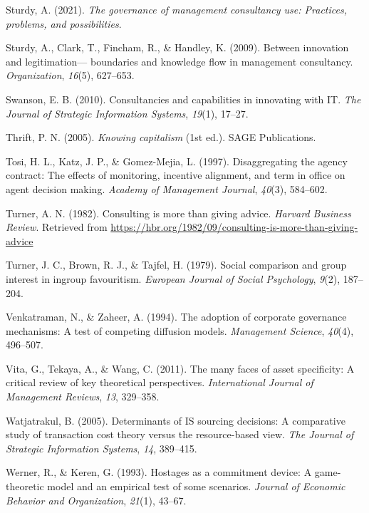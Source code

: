 \documentclass[
  man,floatsintext]{apa6}
\newlength{\cslhangindent}
\newenvironment{CSLReferences}[2] %
 {\begin{list}{}{%
  \setlength{\itemindent}{0pt}
  \setlength{\leftmargin}{0pt}
  \setlength{\parsep}{0pt}
  \ifodd #1
   \setlength{\leftmargin}{\cslhangindent}
   \setlength{\itemindent}{-1\cslhangindent}
  \fi
  \setlength{\itemsep}{#2\baselineskip}}}
 {\end{list}}
\begin{document}
\begin{CSLReferences}{1}{0}
Sturdy, A. (2021). \emph{The governance of management consultancy use: Practices, problems, and possibilities}.

Sturdy, A., Clark, T., Fincham, R., \& Handley, K. (2009). Between innovation and legitimation--- boundaries and knowledge flow in management consultancy. \emph{Organization}, \emph{16}(5), 627--653.

Swanson, E. B. (2010). Consultancies and capabilities in innovating with IT. \emph{The Journal of Strategic Information Systems}, \emph{19}(1), 17--27.

Thrift, P. N. (2005). \emph{Knowing capitalism} (1st ed.). SAGE Publications.

Tosi, H. L., Katz, J. P., \& Gomez-Mejia, L. (1997). Disaggregating the agency contract: The effects of monitoring, incentive alignment, and term in office on agent decision making. \emph{Academy of Management Journal}, \emph{40}(3), 584--602.

Turner, A. N. (1982). Consulting is more than giving advice. \emph{Harvard Business Review}. Retrieved from \url{https://hbr.org/1982/09/consulting-is-more-than-giving-advice}

Turner, J. C., Brown, R. J., \& Tajfel, H. (1979). Social comparison and group interest in ingroup favouritism. \emph{European Journal of Social Psychology}, \emph{9}(2), 187--204.

Venkatraman, N., \& Zaheer, A. (1994). The adoption of corporate governance mechanisms: A test of competing diffusion models. \emph{Management Science}, \emph{40}(4), 496--507.

Vita, G., Tekaya, A., \& Wang, C. (2011). The many faces of asset specificity: A critical review of key theoretical perspectives. \emph{International Journal of Management Reviews}, \emph{13}, 329--358.

Watjatrakul, B. (2005). Determinants of IS sourcing decisions: A comparative study of transaction cost theory versus the resource-based view. \emph{The Journal of Strategic Information Systems}, \emph{14}, 389--415.

Werner, R., \& Keren, G. (1993). Hostages as a commitment device: A game-theoretic model and an empirical test of some scenarios. \emph{Journal of Economic Behavior and Organization}, \emph{21}(1), 43--67.


\end{CSLReferences}
\end{document}
